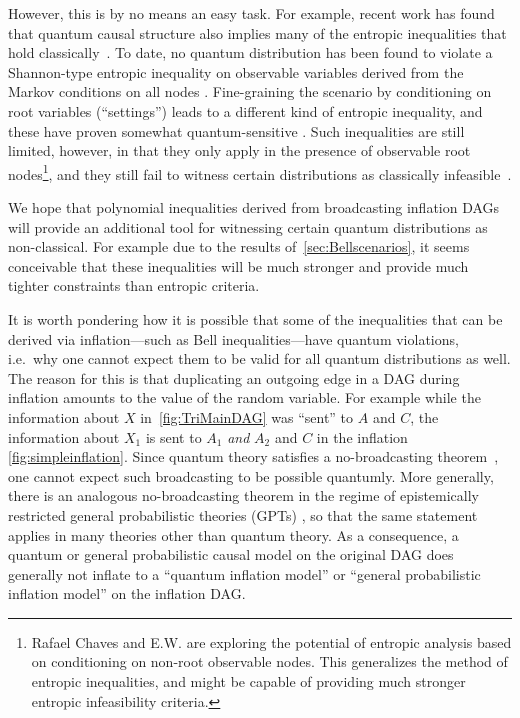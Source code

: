 However, this is by no means an easy task. For example, recent work has found that quantum causal structure also implies many of the entropic inequalities that hold classically~\cite{pusey2014gdag,Chaves2015infoquantum,ChavesNoSignalling}. To date, no quantum distribution has been found to violate a Shannon-type entropic inequality on observable variables derived from the Markov conditions on all nodes \cite{chaves2012entropic,fritz2012bell}. Fine-graining the scenario by conditioning on root variables (``settings'') leads to a different kind of entropic inequality, and these have proven somewhat quantum-sensitive \cite{braunstein1988entropic,SchumacherInequality,chaves2014novel}. Such inequalities are still limited, however, in that they only apply in the presence of observable root nodes\footnote{Rafael Chaves and E.W. are exploring the potential of entropic analysis based on conditioning on non-root observable nodes. This generalizes the method of entropic inequalities, and might be capable of providing much stronger entropic infeasibility criteria.}, and they still fail to witness certain distributions as classically infeasible~\cite{chaves2014novel,fritz2012bell}.

We hope that polynomial inequalities derived from broadcasting inflation DAGs will provide an additional tool for witnessing certain quantum distributions as non-classical. For example due to the results of~\cref{sec:Bellscenarios}, it seems conceivable that these inequalities will be much stronger and provide much tighter constraints than entropic criteria.

It is worth pondering how it is possible that some of the inequalities that can be derived via inflation---such as Bell inequalities---have quantum violations, i.e.~why one cannot expect them to be valid for all quantum distributions as well. The reason for this is that duplicating an outgoing edge in a DAG during inflation amounts to  the value of the random variable. For example while the information about $X$ in~\cref{fig:TriMainDAG} was ``sent'' to $A$ and $C$, the information about $X_1$ is sent to $A_1$ \emph{and} $A_2$ and $C$ in the inflation \cref{fig:simpleinflation}. Since quantum theory satisfies a no-broadcasting theorem~\cite{NoCloningQuantum1996,NoCloningGeneral2006}, one cannot expect such broadcasting to be possible quantumly. More generally, there is an analogous no-broadcasting theorem in the regime of epistemically restricted general probabilistic theories (GPTs) \cite{SpekkensToyTheory,NoCloningGeneral2006,Barnum2012GPT,Janotta2014GPT}, so that the same statement applies in many theories other than quantum theory. As a consequence, a quantum or general probabilistic causal model on the original DAG does generally not inflate to a ``quantum inflation model'' or ``general probabilistic inflation model'' on the inflation DAG. 

